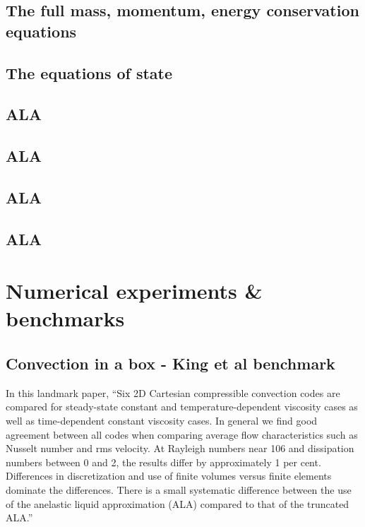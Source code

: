 \documentclass[a4paper,11pt]{article}
\begin{document}
\subsection{The full mass, momentum, energy conservation equations}

\subsection{The equations of state}

\subsection{ALA}

\subsection{ALA}

\subsection{ALA}

\subsection{ALA}

















\newpage
\section{Numerical experiments \& benchmarks}



\subsection{Convection in a box - King et al benchmark}

In this landmark paper, 
``Six 2D Cartesian compressible convection codes
are compared for steady-state constant and temperature-dependent viscosity cases as well
as time-dependent constant viscosity cases. In general we find good agreement between all
codes when comparing average flow characteristics such as Nusselt number and rms velocity.
At Rayleigh numbers near 106 and dissipation numbers between 0 and 2, the results differ
by approximately 1 per cent. Differences in discretization and use of finite volumes versus
finite elements dominate the differences. There is a small systematic difference between the
use of the anelastic liquid approximation (ALA) compared to that of the truncated ALA.''
\end{document}
